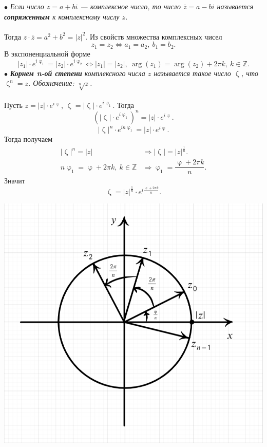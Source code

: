 \documentclass[a4paper, 12pt]{article}
\newcommand{\Z}{\mathbb{Z}}
\renewcommand{\varphi}{\upvarphi}
\newcommand\ef[1]{e^{i#1}}
\begin{document}
$\bullet$ \textit{Если число $z = a+bi$ --- комплексное число, то число $\overline{z} = a - bi$ называется \textbf{сопряженным} к комплексному числу $z$.}\\\\
Тогда $z\cdot \overline{z} = a^2 + b^2 = |z|^2.$ Из свойств множества комплексных чисел $$z_1=z_2 \Longleftrightarrow a_1 = a_2,\ b_1 = b_2.$$
В экспоненциальной форме
$$|z_1|\cdot\ef{\varphi_1} = |z_2|\cdot\ef{\varphi_2}\Longleftrightarrow |z_1| = |z_2|,\ \arg(z_1) = \arg(z_2) + 2\pi k,\ k\in \Z.$$
$\bullet$ \textit{\textbf{Корнем n-ой степени} комплексного числа $z$ называется такое число $\upzeta$, что $\upzeta ^ n = z$. Обозначение: $\sqrt[n]{z}$.}\\\\
Пусть $z = |z|\cdot \ef{\varphi}$, $\upzeta = |\upzeta|\cdot \ef{\varphi_1}$. Тогда $$(|\upzeta|\cdot \ef{\varphi_1})^n = |z|\cdot  \ef{\varphi}.$$
$$|\upzeta|^n\cdot\ef{n\varphi_1} = |z|\cdot \ef{\varphi}.$$
Тогда получаем
	\begin{align*}
		|\upzeta|^n = |z| &\Rightarrow |\upzeta| = |z|^{\frac1n}.\\
		n\varphi_1 = \varphi + 2\pi k,\ k \in \Z &\Rightarrow \varphi_1 = \dfrac{\varphi + 2\pi k}{n}.
	\end{align*}
Значит $$\upzeta = |z|^{\frac{1}{n}}\cdot \ef{\frac{\varphi + 2\pi k}{n}}.$$
\noindent
\parbox[b][8.5cm][t]{10mm}{
	\includegraphics[scale=0.4]{images/006.png}}
\end{document}
